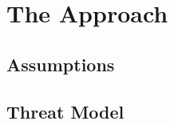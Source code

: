 \section{The \SYSTEM{} Approach} \label{sec:approach}

\TODO{()}

\subsection{Assumptions}

\subsection{Threat Model}

